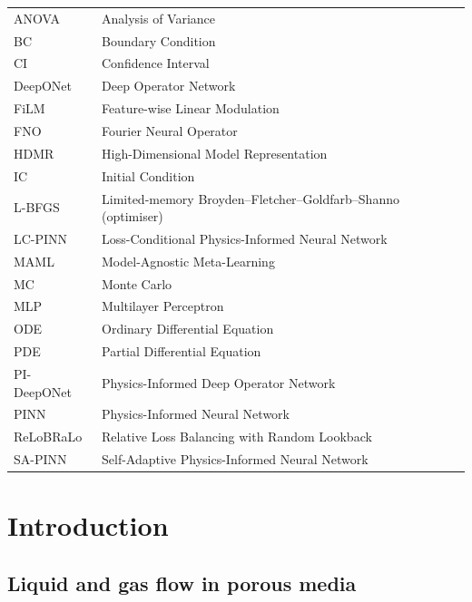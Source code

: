 \documentclass[12pt,a4paper]{extarticle}
\begin{document}
\noindent\begin{tabular}{@{}p{3cm}p{12cm}@{}}
ANOVA      & Analysis of Variance \\
BC         & Boundary Condition \\
CI         & Confidence Interval \\
DeepONet   & Deep Operator Network \\
FiLM       & Feature-wise Linear Modulation \\
FNO        & Fourier Neural Operator \\
HDMR       & High-Dimensional Model Representation \\
IC         & Initial Condition \\
L-BFGS     & Limited-memory Broyden--Fletcher--Goldfarb--Shanno (optimiser) \\
LC-PINN    & Loss-Conditional Physics-Informed Neural Network \\
MAML       & Model-Agnostic Meta-Learning \\
MC         & Monte Carlo \\
MLP        & Multilayer Perceptron \\
ODE        & Ordinary Differential Equation \\
PDE        & Partial Differential Equation \\
PI-DeepONet & Physics-Informed Deep Operator Network \\
PINN       & Physics-Informed Neural Network \\
ReLoBRaLo  & Relative Loss Balancing with Random Lookback \\
SA-PINN    & Self-Adaptive Physics-Informed Neural Network \\
\end{tabular}

\newpage

\section{Introduction}
\label{sec:intro}

\subsection{Liquid and gas flow in porous media}
\end{document}
